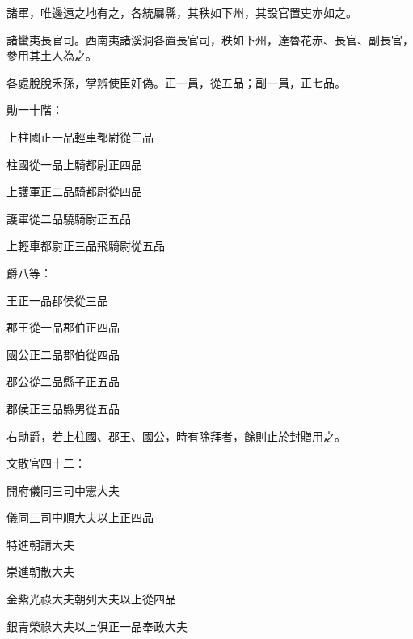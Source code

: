 \begin{pinyinscope}
 諸軍，唯邊遠之地有之，各統屬縣，其秩如下州，其設官置吏亦如之。



 諸蠻夷長官司。西南夷諸溪洞各置長官司，秩如下州，達魯花赤、長官、副長官，參用其土人為之。



 各處脫脫禾孫，掌辨使臣奸偽。正一員，從五品；副一員，正七品。



 勛一十階：



 上柱國正一品輕車都尉從三品



 柱國從一品上騎都尉正四品



 上護軍正二品騎都尉從四品



 護軍從二品驍騎尉正五品



 上輕車都尉正三品飛騎尉從五品



 爵八等：



 王正一品郡侯從三品



 郡王從一品郡伯正四品



 國公正二品郡伯從四品



 郡公從二品縣子正五品



 郡侯正三品縣男從五品



 右勛爵，若上柱國、郡王、國公，時有除拜者，餘則止於封贈用之。



 文散官四十二：



 開府儀同三司中憲大夫



 儀同三司中順大夫以上正四品



 特進朝請大夫



 崇進朝散大夫



 金紫光祿大夫朝列大夫以上從四品



 銀青榮祿大夫以上俱正一品奉政大夫




\end{pinyinscope}
